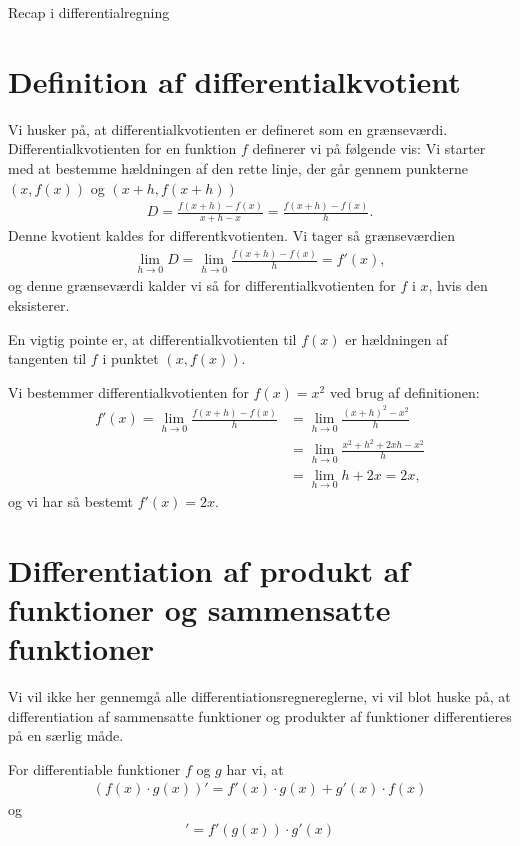
\begin{center}
\Huge
Recap i differentialregning
\end{center}
\section*{Definition af differentialkvotient}
Vi husker på, at differentialkvotienten er defineret som en grænseværdi. Differentialkvotienten for en funktion $f$ definerer vi på følgende vis: Vi starter med at bestemme hældningen af den rette linje, der går gennem punkterne $(x,f(x))$ og $(x+h,f(x+h))$
\begin{align*}
D = \frac{f(x+h)-f(x)}{x+h-x} = \frac{f(x+h)-f(x)}{h}.
\end{align*}
Denne kvotient kaldes for differentkvotienten. Vi tager så grænseværdien
\begin{align*}
\lim_{h\to 0}D = \lim_{h\to 0} \frac{f(x+h)-f(x)}{h} = f'(x),
\end{align*}
og denne grænseværdi kalder vi så for differentialkvotienten for $f$ i $x$, hvis den eksisterer.

En vigtig pointe er, at differentialkvotienten til $f(x)$ er hældningen af tangenten til $f$ i punktet $(x,f(x))$.
\begin{exa}
Vi bestemmer differentialkvotienten for $f(x) = x^2$ ved brug af definitionen:
\begin{align*}
f'(x)=\lim_{h\to 0} \frac{f(x+h)-f(x)}{h} &= \lim_{h\to 0}\frac{(x+h)^2-x^2}{h} \\
&= \lim_{h\to 0}\frac{x^2+h^2+2xh-x^2}{h}\\
&= \lim_{h\to 0}h+2x = 2x,
\end{align*}
og vi har så bestemt $f'(x) = 2x$.
\end{exa}
\section*{Differentiation af produkt af funktioner og sammensatte funktioner}
Vi vil ikke her gennemgå alle differentiationsregnereglerne, vi vil blot huske på, at differentiation af sammensatte funktioner og produkter af funktioner differentieres på en særlig måde.
\begin{setn}
For differentiable funktioner $f$ og $g$ har vi, at 
\begin{align*}
(f(x)\cdot g(x))' = f'(x)\cdot g(x) + g'(x)\cdot f(x)
\end{align*}
og 
\begin{align*}
[f(g(x))]' = f'(g(x))\cdot g'(x)
\end{align*}
\end{setn}

